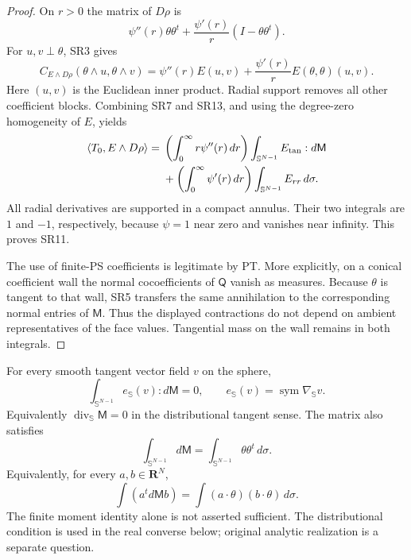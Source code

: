 \begin{proof}
On $r>0$ the matrix of $D\rho$ is
\[
       \psi''(r)\theta\theta^t
           +\frac{\psi'(r)}r(I-\theta\theta^t).
 \tag{SR12}
\]
For $u,v\perp\theta$, SR3 gives
\[
 C_{E\wedge D\rho}(\theta\wedge u,\theta\wedge v)
       =\psi''(r)E(u,v)
                +\frac{\psi'(r)}r E(\theta,\theta)(u,v).
 \tag{SR13}
\]
Here $(u,v)$ is the Euclidean inner product.  Radial
support removes all other coefficient blocks.  Combining
SR7 and SR13, and using the degree-zero homogeneity of
$E$, yields
\[
\begin{split}
\langle T_0,E\wedge D\rho\rangle
={}&\left(\int_0^\infty r\psi''(r)\,dr\right)
            \int_{\mathbb S^{N-1}}E_{\rm tan}:d\mathsf M\\
 &+\left(\int_0^\infty\psi'(r)\,dr\right)
            \int_{\mathbb S^{N-1}}E_{rr}\,d\sigma.
\end{split}
\]
All radial derivatives are supported in a compact annulus.
Their two integrals are $1$ and $-1$, respectively, because
$\psi=1$ near zero and vanishes near infinity.  This proves
SR11.

The use of finite-PS coefficients is legitimate by PT.
More explicitly, on a conical coefficient wall the normal
cocoefficients of $\mathsf Q$ vanish as measures.  Because
$\theta$ is tangent to that wall, SR5 transfers the same
annihilation to the corresponding normal entries of
$\mathsf M$.  Thus the displayed contractions do not depend
on ambient representatives of the face values.  Tangential
mass on the wall remains in both integrals.
\end{proof}

\begin{corollary}
\label{cor:r13-angular-constant-tensor-balance}
For every smooth tangent vector field $v$ on the sphere,
\[
           \int_{\mathbb S^{N-1}}e_{\mathbb S}(v):d\mathsf M=0,
           \qquad e_{\mathbb S}(v)=\operatorname{sym}\nabla_{\mathbb S}v.
 \tag{SR14a}
\]
Equivalently $\operatorname{div}_{\mathbb S}\mathsf M=0$
in the distributional tangent sense.  The matrix also satisfies
\[
       \int_{\mathbb S^{N-1}}d\mathsf M
            =\int_{\mathbb S^{N-1}}\theta\theta^t\,d\sigma.
 \tag{SR14}
\]
Equivalently, for every $a,b\in\mathbf R^N$,
\[
 \int (a^t d\mathsf M b)
                =\int(a\cdot\theta)(b\cdot\theta)\,d\sigma.
\]
The finite moment identity alone is not asserted sufficient.
The distributional condition is used in the real converse
below; original analytic realization is a separate question.
\end{corollary}

